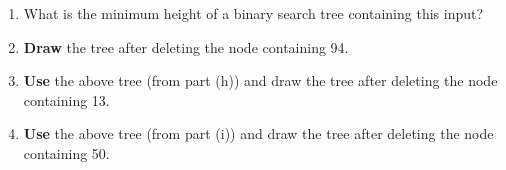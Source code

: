 \documentclass[12pt, a4paper]{article}
\begin{document}
\begin{enumerate}
\begin{enumerate}
        \item What is the minimum height of a binary search tree containing this input?
        
        \item \textbf{Draw} the tree after deleting the node containing 94.
        
        \item \textbf{Use} the above tree (from part (h)) and draw the tree after deleting the node containing 13.
        
        \item \textbf{Use} the above tree (from part (i)) and draw the tree after deleting the node containing 50.
    
    \end{enumerate}

\end{enumerate}
\end{document}
